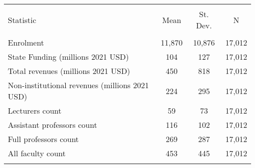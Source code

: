 
\begin{tabular}{@{\extracolsep{5pt}}lccc} 
\\[-1.8ex]\hline 
\hline \\[-1.8ex] 
Statistic & \multicolumn{1}{c}{Mean} & \multicolumn{1}{c}{St. Dev.} & \multicolumn{1}{c}{N} \\ 
\hline \\[-1.8ex] 
Enrolment & 11,870 & 10,876 & 17,012 \\ 
State Funding (millions 2021 USD) & 104 & 127 & 17,012 \\ 
Total revenues (millions 2021 USD) & 450 & 818 & 17,012 \\ 
Non-institutional revenues (millions 2021 USD) & 224 & 295 & 17,012 \\ 
Lecturers count & 59 & 73 & 17,012 \\ 
Assistant professors count & 116 & 102 & 17,012 \\ 
Full professors count & 269 & 287 & 17,012 \\ 
All faculty count & 453 & 445 & 17,012 \\ 
\hline \\[-1.8ex] 
\end{tabular} 
